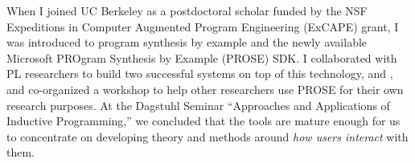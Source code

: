 \documentclass[justified]{tufte-handout}
\begin{document}

When I joined UC Berkeley as a postdoctoral scholar funded by the NSF Expeditions in Computer Augmented Program Engineering (ExCAPE) grant, I was introduced to program synthesis by example and the newly available Microsoft PROgram Synthesis by Example (PROSE) SDK. I collaborated with PL researchers to build two successful systems on top of this technology,  and , and co-organized a workshop to help other researchers use PROSE for their own research purposes. At the Dagstuhl Seminar ``Approaches and Applications of Inductive Programming,'' we concluded that the tools are mature enough for us to concentrate on developing theory and methods around \emph{how users interact} with them.
\\


\end{document}
